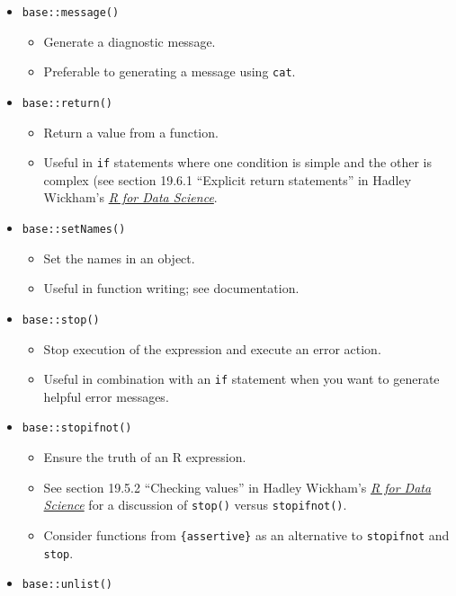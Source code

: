 \documentclass[
]{book}
\providecommand{\tightlist}{%
  \setlength{\itemsep}{0pt}\setlength{\parskip}{0pt}}
\begin{document}
\begin{itemize}
\tightlist
\item
  \texttt{base::message()}

  \begin{itemize}
  \tightlist
  \item
    Generate a diagnostic message.
  \item
    Preferable to generating a message using \texttt{cat}.
  \end{itemize}
\item
  \texttt{base::return()}

  \begin{itemize}
  \tightlist
  \item
    Return a value from a function.
  \item
    Useful in \texttt{if} statements where one condition is simple and the other is complex (see section 19.6.1 ``Explicit return statements'' in Hadley Wickham's \href{https://r4ds.had.co.nz/functions.html}{\emph{R for Data Science}}.
  \end{itemize}
\item
  \texttt{base::setNames()}

  \begin{itemize}
  \tightlist
  \item
    Set the names in an object.
  \item
    Useful in function writing; see documentation.
  \end{itemize}
\item
  \texttt{base::stop()}

  \begin{itemize}
  \tightlist
  \item
    Stop execution of the expression and execute an error action.
  \item
    Useful in combination with an \texttt{if} statement when you want to generate helpful error messages.
  \end{itemize}
\item
  \texttt{base::stopifnot()}

  \begin{itemize}
  \tightlist
  \item
    Ensure the truth of an R expression.
  \item
    See section 19.5.2 ``Checking values'' in Hadley Wickham's \href{https://r4ds.had.co.nz/functions.html}{\emph{R for Data Science}} for a discussion of \texttt{stop()} versus \texttt{stopifnot()}.
  \item
    Consider functions from \texttt{\{assertive\}} as an alternative to \texttt{stopifnot} and \texttt{stop}.
  \end{itemize}
\item
  \texttt{base::unlist()}


\end{itemize}
\end{document}
